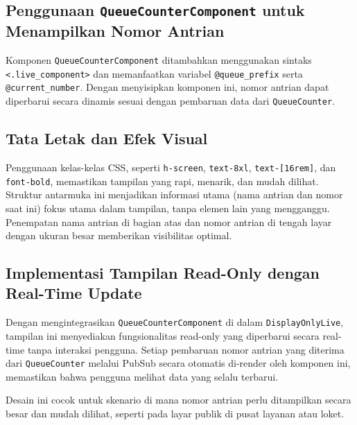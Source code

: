 \subsection{Penggunaan \texttt{QueueCounterComponent} untuk Menampilkan Nomor Antrian}
Komponen \texttt{QueueCounterComponent} ditambahkan menggunakan sintaks \texttt{<.live\_component>} dan memanfaatkan variabel \texttt{@queue\_prefix} serta \texttt{@current\_number}. Dengan menyisipkan komponen ini, nomor antrian dapat diperbarui secara dinamis sesuai dengan pembaruan data dari \texttt{QueueCounter}. 

\subsection{Tata Letak dan Efek Visual}
Penggunaan kelas-kelas CSS, seperti \texttt{h-screen}, \texttt{text-8xl}, \texttt{text-[16rem]}, dan \texttt{font-bold}, memastikan tampilan yang rapi, menarik, dan mudah dilihat. Struktur antarmuka ini menjadikan informasi utama (nama antrian dan nomor saat ini) fokus utama dalam tampilan, tanpa elemen lain yang mengganggu. Penempatan nama antrian di bagian atas dan nomor antrian di tengah layar dengan ukuran besar memberikan visibilitas optimal.

\subsection{Implementasi Tampilan Read-Only dengan Real-Time Update}
Dengan mengintegrasikan \texttt{QueueCounterComponent} di dalam \texttt{DisplayOnlyLive}, tampilan ini menyediakan fungsionalitas read-only yang diperbarui secara real-time tanpa interaksi pengguna. Setiap pembaruan nomor antrian yang diterima dari \texttt{QueueCounter} melalui PubSub secara otomatis di-render oleh komponen ini, memastikan bahwa pengguna melihat data yang selalu terbarui.

Desain ini cocok untuk skenario di mana nomor antrian perlu ditampilkan secara besar dan mudah dilihat, seperti pada layar publik di pusat layanan atau loket.


